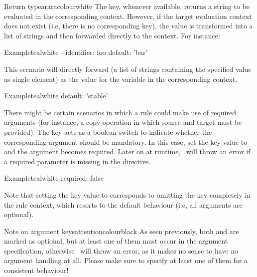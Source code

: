 \begin{description}
\begin{description}
\begin{messagebox}{Return type}{araracolour}{\icinfo}{white}
\setlength{\parskip}{1em}
The  key, whenever available, returns a string to be evaluated in the corresponding  context. However, if the target evaluation context does not exist (i.e, there is no corresponding  key), the value is transformed into a list of strings and then forwarded directly to the  context. For instance:

\begin{codebox}{Example}{teal}{\icnote}{white}
- identifier: foo
  default: 'bar'
\end{codebox}

This scenario will directly forward \rbox[araracolour]{\hspace{1ex}[ 'bar' ] \hspace{1ex}} (a list of strings containing the specified value as single element) as the value for the  variable in the corresponding  context.
\end{messagebox}

\begin{codebox}{Example}{teal}{\icnote}{white}
default: 'stable'
\end{codebox}

\item[\describecontext{O}{arguments}{required}] There might be certain scenarios in which a rule could make use of required arguments (for instance, a copy operation in which source and target must be provided). The  key acts as a boolean switch to indicate whether the corresponding argument should be mandatory. In this case, set the key value to  and the argument becomes required. Later on at runtime, \arara\ will throw an error if a required parameter is missing in the directive.

\begin{codebox}{Example}{teal}{\icnote}{white}
required: false
\end{codebox}

Note that setting the  key value to  corresponds to omitting the key completely in the rule context, which resorts to the default behaviour (i.e, all arguments are optional).
\end{description}

\begin{messagebox}{Note on argument keys}{attentioncolour}{\icattention}{black}
As seen previously, both  and  are marked as optional, but at least one of them must occur in the argument specification, otherwise \arara\ will throw an error, as it makes no sense to have no argument handling at all. Please make sure to specify at least one of them for a consistent behaviour!
\end{messagebox}


\end{description}
